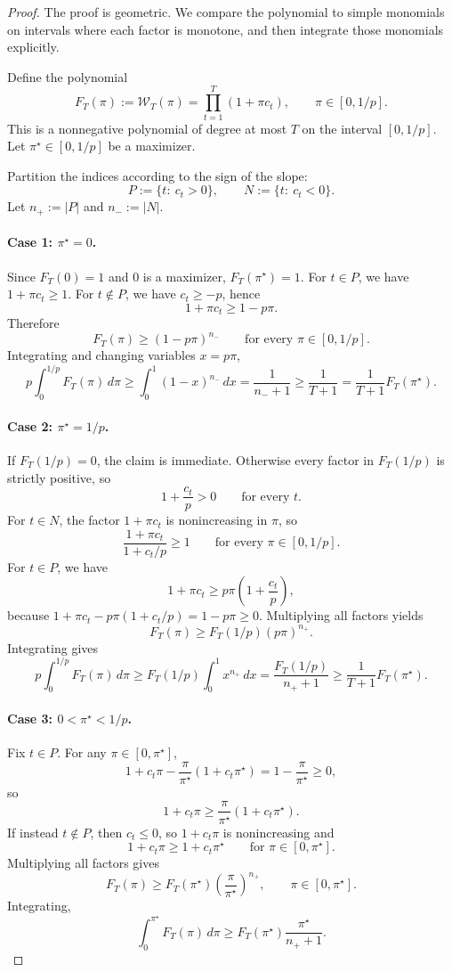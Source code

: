 \documentclass[11pt]{article}
\newcommand{\1}{\mathbf{1}}
\begin{document}
\begin{proof}
The proof is geometric. We compare the polynomial to simple monomials on intervals where each factor is monotone, and then integrate those monomials explicitly.

Define the polynomial
\[
F_T(\pi):=\mathcal W_T(\pi)=\prod_{t=1}^T (1+\pi c_t),
\qquad \pi\in[0,1/p].
\]
This is a nonnegative polynomial of degree at most \(T\) on the interval \([0,1/p]\). Let \(\pi^\star\in[0,1/p]\) be a maximizer.

Partition the indices according to the sign of the slope:
\[
P:=\{t:\ c_t>0\},
\qquad
N:=\{t:\ c_t<0\}.
\]
Let \(n_+:=|P|\) and \(n_-:=|N|\).

\paragraph{Case 1: \(\pi^\star=0\).}
Since \(F_T(0)=1\) and \(0\) is a maximizer, \(F_T(\pi^\star)=1\). For \(t\in P\), we have \(1+\pi c_t\ge 1\). For \(t\notin P\), we have \(c_t\ge -p\), hence
\[
1+\pi c_t\ge 1-p\pi.
\]
Therefore
\[
F_T(\pi)\ge (1-p\pi)^{n_-}
\qquad\text{for every }\pi\in[0,1/p].
\]
Integrating and changing variables \(x=p\pi\),
\[
p\int_0^{1/p}F_T(\pi)\,d\pi
\ge
\int_0^1 (1-x)^{n_-}\,dx
=
\frac{1}{n_-+1}
\ge
\frac{1}{T+1}
=
\frac{1}{T+1}F_T(\pi^\star).
\]

\paragraph{Case 2: \(\pi^\star=1/p\).}
If \(F_T(1/p)=0\), the claim is immediate. Otherwise every factor in \(F_T(1/p)\) is strictly positive, so
\[
1+\frac{c_t}{p}>0
\qquad\text{for every }t.
\]
For \(t\in N\), the factor \(1+\pi c_t\) is nonincreasing in \(\pi\), so
\[
\frac{1+\pi c_t}{1+c_t/p}\ge 1
\qquad\text{for every }\pi\in[0,1/p].
\]
For \(t\in P\), we have
\[
1+\pi c_t \ge p\pi\left(1+\frac{c_t}{p}\right),
\]
because \(1+\pi c_t-p\pi(1+c_t/p)=1-p\pi\ge 0\). Multiplying all factors yields
\[
F_T(\pi)\ge F_T(1/p)(p\pi)^{n_+}.
\]
Integrating gives
\[
p\int_0^{1/p}F_T(\pi)\,d\pi
\ge
F_T(1/p)\int_0^1 x^{n_+}\,dx
=
\frac{F_T(1/p)}{n_++1}
\ge
\frac{1}{T+1}F_T(\pi^\star).
\]

\paragraph{Case 3: \(0<\pi^\star<1/p\).}
Fix \(t\in P\). For any \(\pi\in[0,\pi^\star]\),
\[
1+c_t\pi - \frac{\pi}{\pi^\star}(1+c_t\pi^\star)
=
1-\frac{\pi}{\pi^\star}\ge 0,
\]
so
\[
1+c_t\pi \ge \frac{\pi}{\pi^\star}(1+c_t\pi^\star).
\]
If instead \(t\notin P\), then \(c_t\le 0\), so \(1+c_t\pi\) is nonincreasing and
\[
1+c_t\pi \ge 1+c_t\pi^\star
\qquad\text{for }\pi\in[0,\pi^\star].
\]
Multiplying all factors gives
\[
F_T(\pi)\ge F_T(\pi^\star)\left(\frac{\pi}{\pi^\star}\right)^{n_+},
\qquad \pi\in[0,\pi^\star].
\]
Integrating,
\[
\int_0^{\pi^\star}F_T(\pi)\,d\pi
\ge
F_T(\pi^\star)\frac{\pi^\star}{n_++1}.
\]


\end{proof}
\end{document}
